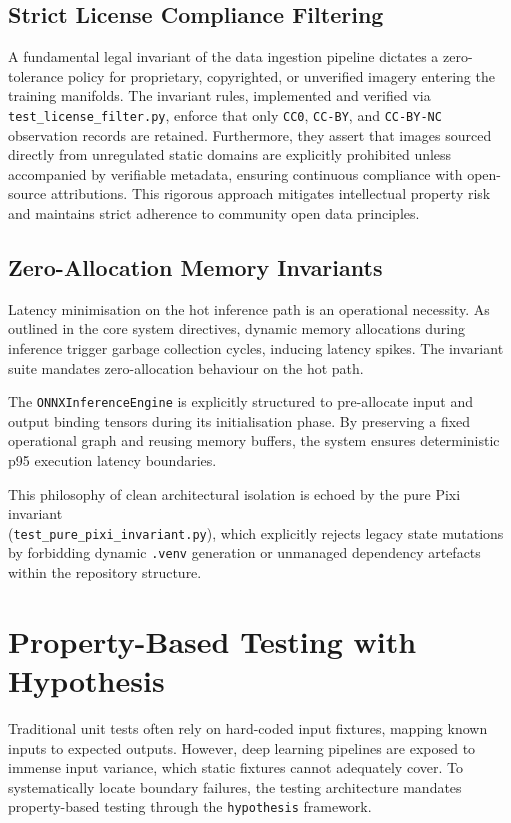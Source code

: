 \subsection{Strict License Compliance Filtering}

A fundamental legal invariant of the data ingestion pipeline dictates a zero-tolerance policy for proprietary, copyrighted, or unverified imagery entering the training manifolds. The invariant rules, implemented and verified via \texttt{test\_license\_filter.py}, enforce that only \texttt{CC0}, \texttt{CC-BY}, and \texttt{CC-BY-NC} observation records are retained. Furthermore, they assert that images sourced directly from unregulated static domains are explicitly prohibited unless accompanied by verifiable metadata, ensuring continuous compliance with open-source attributions. This rigorous approach mitigates intellectual property risk and maintains strict adherence to community open data principles.

\subsection{Zero-Allocation Memory Invariants}

Latency minimisation on the hot inference path is an operational necessity. As outlined in the core system directives, dynamic memory allocations during inference trigger garbage collection cycles, inducing latency spikes. The invariant suite mandates zero-allocation behaviour on the hot path. 

The \texttt{ONNXInferenceEngine} is explicitly structured to pre-allocate input and output binding tensors during its initialisation phase. By preserving a fixed operational graph and reusing memory buffers, the system ensures deterministic p95 execution latency boundaries. 

This philosophy of clean architectural isolation is echoed by the pure Pixi invariant\\(\texttt{test\_pure\_pixi\_invariant.py}), which explicitly rejects legacy state mutations by forbidding dynamic \texttt{.venv} generation or unmanaged dependency artefacts within the repository structure.

\section{Property-Based Testing with Hypothesis}
\label{sec:property_based_testing}

Traditional unit tests often rely on hard-coded input fixtures, mapping known inputs to expected outputs. However, deep learning pipelines are exposed to immense input variance, which static fixtures cannot adequately cover. To systematically locate boundary failures, the testing architecture mandates property-based testing through the \texttt{hypothesis} framework.

